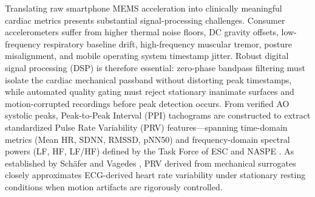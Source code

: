 Translating raw smartphone MEMS acceleration into clinically meaningful cardiac metrics presents substantial signal-processing challenges. Consumer accelerometers suffer from higher thermal noise floors, DC gravity offsets, low-frequency respiratory baseline drift, high-frequency muscular tremor, posture misalignment, and mobile operating system timestamp jitter. Robust digital signal processing (DSP) is therefore essential: zero-phase bandpass filtering must isolate the cardiac mechanical passband without distorting peak timestamps, while automated quality gating must reject stationary inanimate surfaces and motion-corrupted recordings before peak detection occurs. From verified AO systolic peaks, Peak-to-Peak Interval (PPI) tachograms are constructed to extract standardized Pulse Rate Variability (PRV) features---spanning time-domain metrics (Mean HR, SDNN, RMSSD, pNN50) and frequency-domain spectral powers (LF, HF, LF/HF) defined by the Task Force of ESC and NASPE \cite{taskforce1996heart}. As established by Sch{\"a}fer and Vagedes \cite{schafer2013accurate}, PRV derived from mechanical surrogates closely approximates ECG-derived heart rate variability under stationary resting conditions when motion artifacts are rigorously controlled.

